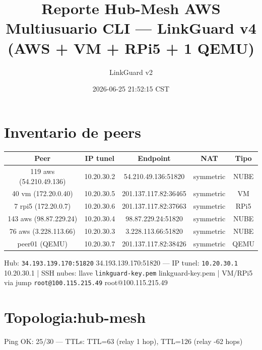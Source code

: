 \documentclass[11pt,a4paper]{article}
\title{Reporte Hub-Mesh AWS Multiusuario CLI — LinkGuard v4 (AWS + VM + RPi5 + 1 QEMU)}
\author{LinkGuard v2}
\date{2026-06-25 21:52:15 CST}
\begin{document}
\maketitle

\section{Inventario de peers}
\begin{longtable}{|c|c|c|c|c|}
\hline
Peer & IP tunel & Endpoint & NAT & Tipo \\ \hline
119 aws (54.210.49.136) & 10.20.30.2 & 54.210.49.136:51820 & symmetric & NUBE \\ \hline
40 vm (172.20.0.40) & 10.20.30.5 & 201.137.117.82:36465 & symmetric & VM \\ \hline
7 rpi5 (172.20.0.7) & 10.20.30.6 & 201.137.117.82:37663 & symmetric & RPi5 \\ \hline
143 aws (98.87.229.24) & 10.20.30.4 & 98.87.229.24:51820 & symmetric & NUBE \\ \hline
76 aws (3.228.113.66) & 10.20.30.3 & 3.228.113.66:51820 & symmetric & NUBE \\ \hline
peer01 (QEMU) & 10.20.30.7 & 201.137.117.82:38426 & symmetric & QEMU \\ \hline
\end{longtable}

Hub:  \texttt{34.193.139.170:51820} 34.193.139.170:51820  — IP tunel:  \texttt{10.20.30.1} 10.20.30.1  | SSH nubes: llave  \texttt{linkguard-key.pem} linkguard-key.pem  | VM/RPi5 via jump  \texttt{root@100.115.215.49} root@100.115.215.49\\

\section{Topologia:hub-mesh}
Ping OK: 25/30 — TTLs: TTL=63 (relay 1 hop), TTL=126 (relay -62 hops)\\
\end{document}
